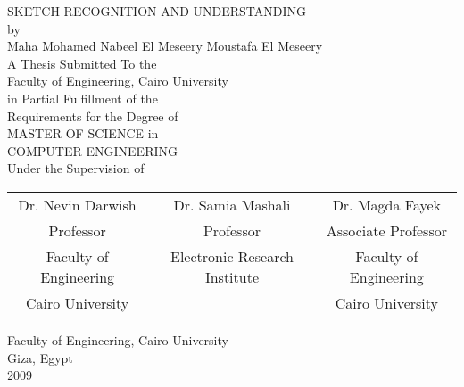 \documentclass[11pt,doublespace]{SketchThesis}
\begin{document}
\newpage    
\thispagestyle{empty}               %
 \begin{center}     
 SKETCH RECOGNITION AND UNDERSTANDING\\
\normalsize by      \\ 
  Maha Mohamed Nabeel El Meseery Moustafa El Meseery\\
\vspace*{0.4in}        
\normalsize
A Thesis Submitted To the\\
Faculty of Engineering, Cairo University\\
in Partial Fulfillment of the\\
Requirements for the Degree of\\
MASTER OF SCIENCE
in\\
COMPUTER ENGINEERING\\
\vspace*{0.4in} 
Under the Supervision of 
\end{center}
  \vspace*{0.4in} 
\begin{center}
 		\begin{tabular}{ccc}
		Dr. Nevin Darwish  & Dr. Samia Mashali & Dr. Magda Fayek \\
		 Professor   & Professor & Associate Professor  \\
		 Faculty of Engineering& Electronic Research Institute & 		 Faculty of Engineering \\
		  Cairo University && Cairo University\\
		\end{tabular}
\end{center}
  \vspace*{0.4in}       
  \vfill
\begin{center}
   Faculty of Engineering, Cairo University \\ Giza, Egypt \\ 2009
\end{center}
 
\newpage       
\thispagestyle{empty}               %
 
\end{document}
